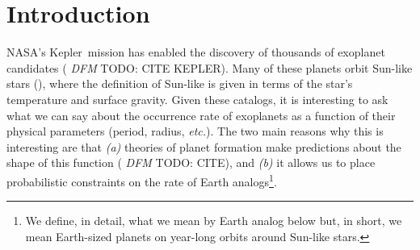 \documentclass[12pt,preprint]{aastex}
\newcommand{\project}[1]{{\sffamily #1}}
\newcommand{\kepler}{\project{Kepler}}
\newcommand{\foreign}[1]{\emph{#1}}
\newcommand{\etc}{\foreign{etc.}}
\newcommand{\todo}[3]{{\color{#2} \emph{#1} TODO: #3}}
\newcommand{\dfmtodo}[1]{\todo{DFM}{red}{#1}}
\begin{document}

\section{Introduction}


NASA's \kepler\ mission has enabled the discovery of thousands of exoplanet
candidates (\dfmtodo{CITE KEPLER}).
Many of these planets orbit Sun-like stars (\citealt{petigura}), where the
definition of Sun-like is given in terms of the star's temperature and surface
gravity.
Given these catalogs, it is interesting to ask what we can say about the
occurrence rate of exoplanets as a function of their physical parameters
(period, radius, \etc).
The two main reasons why this is interesting are that \emph{(a)} theories of
planet formation make predictions about the shape of this function
(\dfmtodo{CITE}), and \emph{(b)} it allows us to place probabilistic
constraints on the rate of Earth analogs\footnote{We define, in detail, what
we mean by Earth analog below but, in short, we mean Earth-sized planets on
year-long orbits around Sun-like stars.}.
\end{document}
